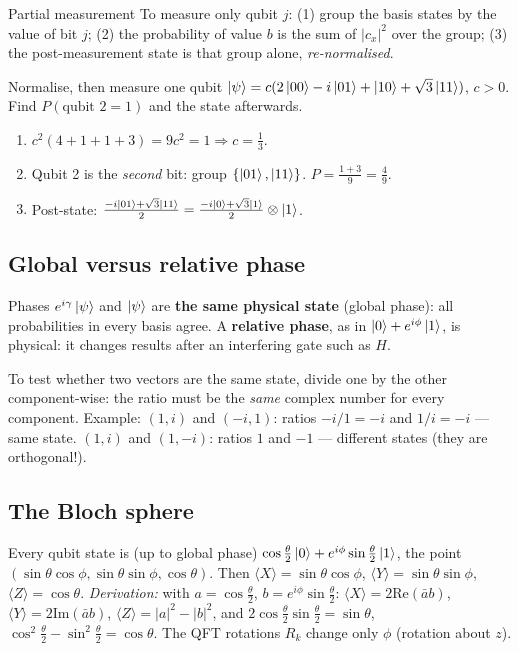 \documentclass[11pt,a4paper,openany]{book}
\newcounter{wex}[chapter]
\newenvironment{steps}{\begin{enumerate}[label=\textbf{Step \arabic*.}, leftmargin=4.2em, itemsep=2pt]}{\end{enumerate}}
\begin{document}
\begin{method}{Partial measurement}
To measure only qubit $j$: (1) group the basis states by the value of bit $j$; (2) the probability of value $b$ is the
sum of $|c_x|^2$ over the group; (3) the post-measurement state is that group alone, \emph{re-normalised}.
\end{method}

\begin{wexample}{Normalise, then measure one qubit}
$\ket\psi = c(2\ket{00} - i\ket{01} + \ket{10} + \sqrt3\ket{11})$, $c > 0$. Find $P(\text{qubit 2} = 1)$ and the state afterwards.
\begin{steps}
\item $c^2(4 + 1 + 1 + 3) = 9c^2 = 1 \Rightarrow c = \frac13$.
\item Qubit 2 is the \emph{second} bit: group $\{\ket{01}, \ket{11}\}$. $P = \frac{1 + 3}{9} = \frac49$.
\item Post-state: $\frac{-i\ket{01} + \sqrt3\ket{11}}{2} = \frac{-i\ket0 + \sqrt3\ket1}{2}\otimes\ket1$.
\end{steps}
\end{wexample}

\subsection{Global versus relative phase}
\begin{keyres}{Phases}
$e^{i\gamma}\ket\psi$ and $\ket\psi$ are \textbf{the same physical state} (global phase): all probabilities in every basis agree.
A \textbf{relative phase}, as in $\ket0 + e^{i\phi}\ket1$, is physical: it changes results after an interfering gate such as $H$.
\end{keyres}
To test whether two vectors are the same state, divide one by the other component-wise: the ratio must be the
\emph{same} complex number for every component. Example: $(1, i)$ and $(-i, 1)$: ratios $-i/1 = -i$ and $1/i = -i$ --- same
state. $(1, i)$ and $(1, -i)$: ratios $1$ and $-1$ --- different states (they are orthogonal!).

\subsection{The Bloch sphere}
Every qubit state is (up to global phase) $\cos\frac\theta2\ket0 + e^{i\phi}\sin\frac\theta2\ket1$, the point $(\sin\theta\cos\phi, \sin\theta\sin\phi, \cos\theta)$.
Then $\langle X\rangle = \sin\theta\cos\phi$, $\langle Y\rangle = \sin\theta\sin\phi$, $\langle Z\rangle = \cos\theta$.
\emph{Derivation:} with $a = \cos\frac\theta2$, $b = e^{i\phi}\sin\frac\theta2$: $\langle X\rangle = 2\mathrm{Re}(\bar a b)$, $\langle Y\rangle = 2\mathrm{Im}(\bar ab)$, $\langle Z\rangle = |a|^2 - |b|^2$, and
$2\cos\frac\theta2\sin\frac\theta2 = \sin\theta$, $\cos^2\frac\theta2 - \sin^2\frac\theta2 = \cos\theta$. The QFT rotations $R_k$ change only $\phi$ (rotation about $z$).
\end{document}
